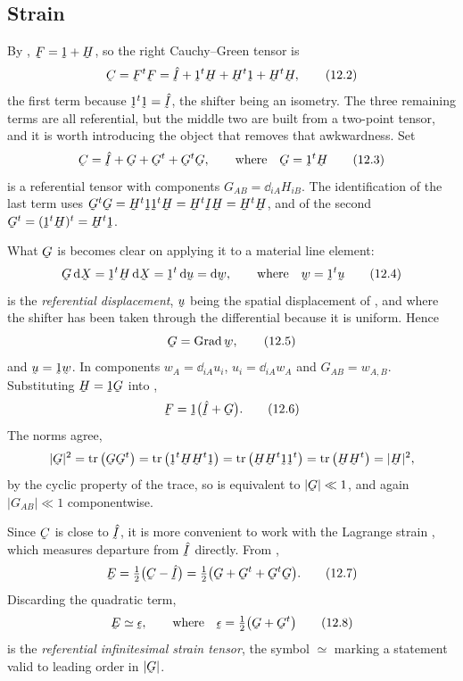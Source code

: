\subsection*{Strain}

By , $\bF=\shift+\bH$, so the right Cauchy--Green tensor is
\begin{equation}
   \bC=\bF^{t}\bF=\hI+\shift^{t}\bH+\bH^{t}\shift+\bH^{t}\bH ,
   \tag{12.2}\label{eq:12.2}
\end{equation}
the first term because $\shift^{t}\shift=\hI$, the shifter being an
isometry. The three remaining terms are all referential, but the middle
two are built from a two-point tensor, and it is worth introducing the
object that removes that awkwardness. Set
\begin{equation}
   \bC=\hI+\bG+\bG^{t}+\bG^{t}\bG,\qquad\text{where}\quad
   \bG=\shift^{t}\bH
   \tag{12.3}\label{eq:12.3}
\end{equation}
is a referential tensor with components $G_{AB}=\dd_{iA}H_{iB}$. The
identification of the last term uses
$\bG^{t}\bG=\bH^{t}\shift\shift^{t}\bH=\bH^{t}\I\bH=\bH^{t}\bH$, and of
the second $\bG^{t}=(\shift^{t}\bH)^{t}=\bH^{t}\shift$.

What $\bG$ is becomes clear on applying it to a material line element:
\begin{equation}
   \bG\,\dl\bX=\shift^{t}\bH\,\dl\bX=\shift^{t}\,\dl\bu=\dl\bw,
   \qquad\text{where}\quad \bw=\shift^{t}\bu
   \tag{12.4}\label{eq:12.4}
\end{equation}
is the \emph{referential displacement}, $\bu$ being the spatial
displacement of , and where the shifter has been taken through
the differential because it is uniform. Hence
\begin{equation}
   \bG=\Grad\bw ,
   \tag{12.5}\label{eq:12.5}
\end{equation}
and $\bu=\shift\bw$. In components $w_{A}=\dd_{iA}u_{i}$,
$u_{i}=\dd_{iA}w_{A}$ and $G_{AB}=w_{A,B}$. Substituting
$\bH=\shift\bG$ into ,
\begin{equation}
   \bF=\shift\big(\hI+\bG\big).
   \tag{12.6}\label{eq:12.6}
\end{equation}
The norms agree,
\[
   |\bG|^{2}=\tr\big(\bG\bG^{t}\big)
   =\tr\big(\shift^{t}\bH\bH^{t}\shift\big)
   =\tr\big(\bH\bH^{t}\shift\shift^{t}\big)=\tr\big(\bH\bH^{t}\big)
   =|\bH|^{2},
\]
by the cyclic property of the trace, so  is equivalent to
$|\bG|\ll1$, and again $|G_{AB}|\ll1$ componentwise.

Since $\bC$ is close to $\hI$, it is more convenient to work with the
Lagrange strain , which measures departure from $\hI$
directly. From ,
\begin{equation}
   \bE=\tfrac12\big(\bC-\hI\big)
   =\tfrac12\big(\bG+\bG^{t}+\bG^{t}\bG\big).
   \tag{12.7}\label{eq:12.7}
\end{equation}
Discarding the quadratic term,
\begin{equation}
   \bE\simeq\vek{\epsilon},\qquad\text{where}\quad
   \vek{\epsilon}=\tfrac12\big(\bG+\bG^{t}\big)
   \tag{12.8}\label{eq:12.8}
\end{equation}
is the \emph{referential infinitesimal strain tensor}, the symbol
$\simeq$ marking a statement valid to leading order in $|\bG|$.

